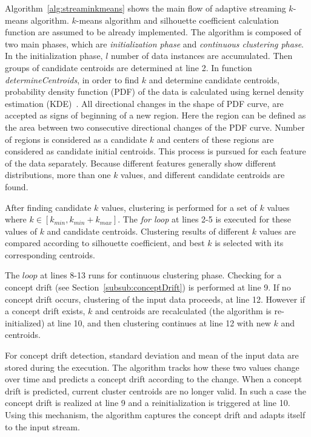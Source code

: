 \documentclass[smallcondensed]{svjour3}     %
\begin{document}
Algorithm~\ref{alg:streaminkmeans} shows the main flow of adaptive streaming $k$-means algorithm. $k$-means algorithm and silhouette coefficient calculation function are assumed to be already implemented. The algorithm is composed of two main phases, which are \textit{initialization phase} and \textit{continuous clustering phase}. In the initialization phase, $l$ number of data instances are accumulated. Then groups of candidate centroids are determined at line 2. In function \textit{determineCentroids}, in order to find $k$ and determine candidate centroids, probability density function (PDF) of the data is calculated using kernel density estimation (KDE)~\citep{parzen:1962:kde, rosenblatt:1956:kde}. All directional changes in the shape of PDF curve, are accepted as signs of beginning of a new region. Here the region can be defined as the area between two consecutive directional changes of the PDF curve. Number of regions is considered as a candidate $k$ and centers of these regions are considered as candidate initial centroids. This process is pursued for each feature of the data separately. Because different features generally show different distributions, more than one $k$ values, and different candidate centroids are found. 

After finding candidate $k$ values, clustering is performed for a set of $k$ values where $k \in [k_{min}, k_{min} + k_{max}]$. The \textit{for loop} at lines 2-5 is executed for these values of $k$ and candidate centroids. Clustering results of different $k$ values are compared according to silhouette coefficient, and best $k$ is selected with its corresponding centroids. 

The $loop$ at lines 8-13 runs for continuous clustering phase. Checking for a concept drift (see Section~\ref{subsub:conceptDrift}) is performed at line 9. If no concept drift occurs, clustering of the input data proceeds, at line 12. However if a concept drift exists, $k$ and centroids are recalculated (the algorithm is re-initialized) at line 10, and then clustering continues at line 12 with new $k$ and centroids. 

For concept drift detection, standard deviation and mean of the input data are stored during the execution. The algorithm tracks how these two values change over time and predicts a concept drift according to the change. When a concept drift is predicted, current cluster centroids are no longer valid. In such a case the concept drift is realized at line 9 and a reinitialization is triggered at line 10. Using this mechanism, the algorithm captures the concept drift and adapts itself to the input stream. 
\end{document}
